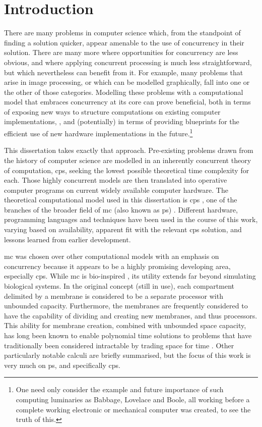 \chapter{Introduction}

There are many problems in computer science which, from the standpoint of finding a solution quicker, appear amenable to the use of concurrency in their solution.  There are many more where opportunities for concurrency are less obvious, and where applying concurrent processing is much less straightforward, but which nevertheless can benefit from it.  For example, many problems that arise in image processing, or which can be modelled graphically, fall into one or the other of those categories.  Modelling these problems with a computational model that embraces concurrency at its core can prove beneficial, both in terms of exposing new ways to structure computations on existing computer implementations, \eg{} \cite{GimelFarb2013a,Nicolescu2014b}, and (potentially) in terms of providing blueprints for the efficient use of new hardware implementations in the future.\footnote{One need only consider the example and future importance of such computing luminaries as Babbage, Lovelace and Boole, all working before a complete working electronic or mechanical computer was created, to see the truth of this.}

This dissertation takes exactly that approach.  Pre-existing problems drawn from the history of computer science are modelled in an inherently concurrent theory of computation, \gls{cps}, seeking the lowest possible theoretical time complexity for each.  Those highly concurrent models are then translated into operative computer programs on current widely available computer hardware.  The theoretical computational model used in this dissertation is \gls{cps} \cite{Nicolescu2018}, one of the branches of the broader field of \gls{mc} (also known as \gls{ps}) \cite{Paun2010b,Paun2002}.  Different hardware, programming languages and techniques have been used in the course of this work, varying based on availability, apparent fit with the relevant \gls{cps} solution, and lessons learned from earlier development.

\Gls{mc} was chosen over other computational models with an emphasis on concurrency because it appears to be a highly promising developing area, especially \gls{cps}.  While \gls{mc} is bio-inspired \cite{Paun2000}, its utility extends far beyond simulating biological systems.  In the original concept (still in use), each \gls{compartment} delimited by a membrane is considered to be a separate processor with unbounded capacity.  Furthermore, the membranes are frequently considered to have the capability of dividing and creating new membranes, and thus processors.  This ability for membrane creation, combined with unbounded space capacity, has long been known to enable polynomial time solutions to problems that have traditionally been considered intractable by trading space for time \cite{Paun1999a,Sosik2003}.
Other particularly notable calculi are briefly summarised, but the focus of this work is very much on \gls{ps}, and specifically \gls{cps}.

